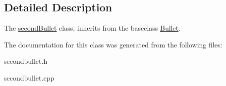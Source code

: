 \subsection{Detailed Description}
The \hyperlink{classsecondBullet}{second\+Bullet} class, inherits from the baseclass \hyperlink{classBullet}{Bullet}. 

The documentation for this class was generated from the following files\+:\begin{DoxyCompactItemize}
\item 
secondbullet.\+h\item 
secondbullet.\+cpp\end{DoxyCompactItemize}

